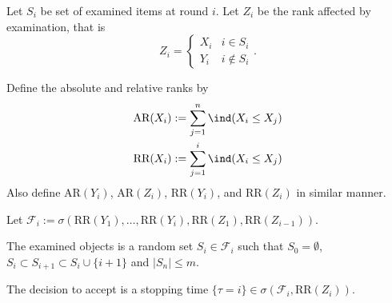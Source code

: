 
Let $S_i$ be set of examined items at round $i$. Let $Z_i$ be the rank affected by examination, that is \[
Z_i = \begin{cases}
	X_i & i \in S_i \\
	Y_i & i \not \in S_i
\end{cases}
.\] 

Define the absolute and relative ranks by 
\begin{align}
	\text{AR}(X_i) &:= \sum_{j=1}^n \ind(X_i \le X_j) \\
	\text{RR}(X_i) &:= \sum_{j=1}^i \ind(X_i \le X_j) \\
\end{align}
Also define $\text{AR}(Y_i)$, $\text{AR}(Z_i)$, $\text{RR}(Y_i)$, and $\text{RR}(Z_i)$ in similar manner.

Let $\mathcal{F}_i := \sigma\left(\text{RR}(Y_1),\ldots,\text{RR}(Y_i),\text{RR}(Z_1), \text{RR}(Z_{i-1}) \right) $.

The examined objects is a random set $S_i \in \mathcal{F}_i$ such that $S_0 = \emptyset$, $S_i \subset S_{i+1} \subset S_i \cup \{i+1\}$ and $|S_n| \le  m$.

The decision to accept is a stopping time $\{\tau = i\} \in \sigma\left( \mathcal{F}_i, \text{RR}(Z_i) \right) $. 
